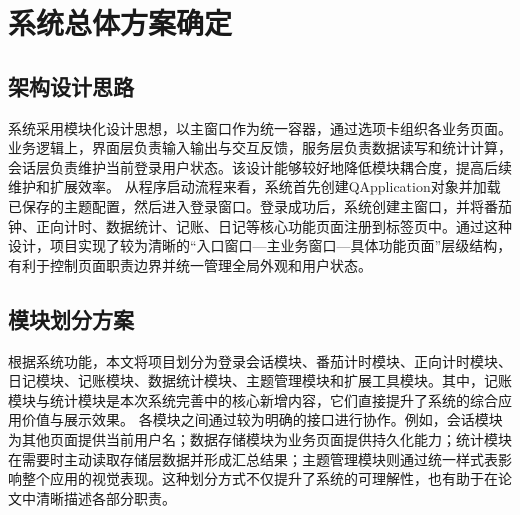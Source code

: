 \section{系统总体方案确定}

\subsection{架构设计思路}
系统采用模块化设计思想，以主窗口作为统一容器，通过选项卡组织各业务页面。业务逻辑上，界面层负责输入输出与交互反馈，服务层负责数据读写和统计计算，会话层负责维护当前登录用户状态。该设计能够较好地降低模块耦合度，提高后续维护和扩展效率。
从程序启动流程来看，系统首先创建QApplication对象并加载已保存的主题配置，然后进入登录窗口。登录成功后，系统创建主窗口，并将番茄钟、正向计时、数据统计、记账、日记等核心功能页面注册到标签页中。通过这种设计，项目实现了较为清晰的“入口窗口—主业务窗口—具体功能页面”层级结构，有利于控制页面职责边界并统一管理全局外观和用户状态。

\subsection{模块划分方案}
根据系统功能，本文将项目划分为登录会话模块、番茄计时模块、正向计时模块、日记模块、记账模块、数据统计模块、主题管理模块和扩展工具模块。其中，记账模块与统计模块是本次系统完善中的核心新增内容，它们直接提升了系统的综合应用价值与展示效果。
各模块之间通过较为明确的接口进行协作。例如，会话模块为其他页面提供当前用户名；数据存储模块为业务页面提供持久化能力；统计模块在需要时主动读取存储层数据并形成汇总结果；主题管理模块则通过统一样式表影响整个应用的视觉表现。这种划分方式不仅提升了系统的可理解性，也有助于在论文中清晰描述各部分职责。